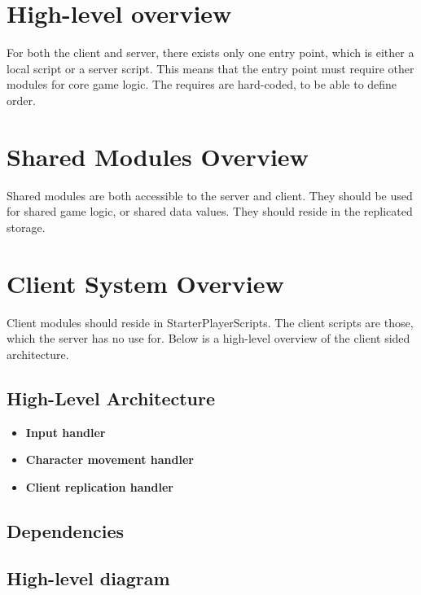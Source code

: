 \chapter{High-level overview}
For both the client and server, there exists only one entry point, which is either a local script or a server script. This means that the entry point must require other modules for core game logic. The requires are hard-coded, to be able to define order.
\chapter{Shared Modules Overview}
Shared modules are both accessible to the server and client. They should be used for shared game logic, or shared data values. They should reside in the replicated storage.
\chapter{Client System Overview}
Client modules should reside in StarterPlayerScripts. The client scripts are those, which the server has no use for.
Below is a high-level overview of the client sided architecture.
\section{High-Level Architecture}
\begin{itemize}
    \item \textbf{Input handler}
    \item \textbf{Character movement handler}
    \item \textbf{Client replication handler}        
\end{itemize}
\section{Dependencies}
\section{High-level diagram}

\begin{center}
\end{center}

